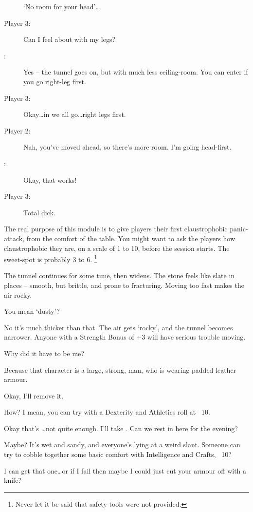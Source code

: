 \begin{multicols}{3}
\begin{description}
  `No room for your head'\ldots
  \item[Player 3:]
  Can I feel about with my legs?
  \item[\Glsentrytext{gm}:]
  Yes -- the tunnel goes on, but with much less ceiling-room.
  You can enter if you go right-leg first.
  \item[Player 3:]
  Okay\ldots in we all go\ldots right legs first.
  \item[Player 2:]
  Nah, you've moved ahead, so there's more room.
  I'm going head-first.
  \item[\Glsentrytext{gm}:]
  Okay, that works!
  \item[Player 3:]
  Total dick.
\end{description}

\bigLine
\vspace{2em}
\noindent
The real purpose of this module is to give players their first claustrophobic panic-attack, from the comfort of the table.
You might want to ask the players how claustrophobic they are, on a scale of 1 to 10, before the session starts.
The sweet-spot is probably 3 to 6.%
\footnote{Never let it be said that safety tools were not provided.}

\bigLine

\begin{description}\sf
  \item[\Glsentrytext{gm}:]
  The tunnel continues for some time, then widens.
  The stone feels like slate in places -- smooth, but brittle, and prone to fracturing.
  Moving too fast makes the air rocky.
  \item[Player 1:]
  You mean `dusty'?
  \item[\Glsentrytext{gm}:]
  No it's much thicker than that.
  The air gets `rocky', and the tunnel becomes narrower.
  Anyone with a Strength Bonus of +3 will have serious trouble moving.
  \item[Player 3:]
  Why did it have to be me?
  \item[\Glsentrytext{gm}:]
  Because that character is a large, strong, man, who is wearing padded leather armour.
  \item[Player 3:]
  Okay, I'll remove it.
  \item[\Glsentrytext{gm}:]
  How?
  I mean, you can try with a Dexterity and Athletics roll at ~10.
  \item[Player 3:]
  Okay that's \ldots not quite enough.
  I'll take .
  Can we rest in here for the evening?
  \item[\Glsentrytext{gm}:]
  Maybe?
  It's wet and sandy, and everyone's lying at a weird slant.
  Someone can try to cobble together some basic comfort with Intelligence and Crafts, ~10?
  \item[Player 1:]
  I can get that one\ldots or if I fail then maybe I could just cut your armour off with a knife?


\end{description}
\end{multicols}
